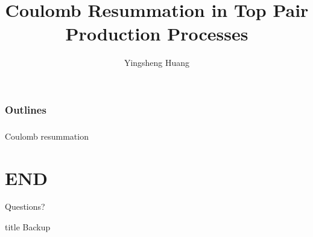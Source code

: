 \documentclass[8pt,dvipsnames,table]{beamer}
\title{Coulomb Resummation in Top Pair Production Processes}
\author[Y. Huang]{Yingsheng Huang}
\institute[IHEP]{Institute of High Energy Physics}
\date
\begin{document}
\begin{frame}{}
	\maketitle
\end{frame}

\begin{frame}
	\frametitle{Outlines}
	\tableofcontents
\end{frame}

\begin{frame}
	\frametitle{}

	Coulomb resummation \cite{Beneke:1999qg}

\end{frame}

\section*{END}
\begin{frame}[standout]
	\Huge Questions?
  \end{frame}

\appendix
\begin{frame}
	\vfill
	\centering
	\begin{beamercolorbox}[sep=8pt,center,shadow=true,rounded=true]{title}
		Backup\par%
	\end{beamercolorbox}
	\vfill
\end{frame}



\end{document}
